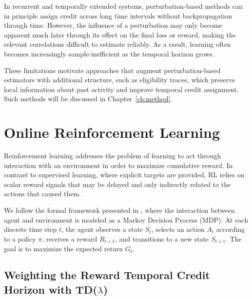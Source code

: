 In recurrent and temporally extended systems, perturbation-based methods
can in principle assign credit across long time intervals without
backpropagation through time. However, the influence of a perturbation may
only become apparent much later through its effect on the final loss or
reward, making the relevant correlations difficult to estimate reliably.
As a result, learning often becomes increasingly sample-inefficient as the
temporal horizon grows.

These limitations motivate approaches that augment perturbation-based
estimators with additional structure, such as eligibility traces, which
preserve local information about past activity and improve temporal credit
assignment. Such methods will be discussed in Chapter~\ref{ch:method}.

\section{Online Reinforcement Learning}
\label{sec:online-rl}
 Reinforcement learning addresses the problem of learning to act through interaction with an environment in order to maximize cumulative reward. In contrast to supervised learning, where explicit targets are provided, RL relies on scalar reward signals that may be delayed and only indirectly related to the actions that caused them.

We follow the formal framework presented in \citet{SuttonBarto2018}, where the interaction between agent and environment is modeled as a Markov Decision Process (MDP). At each discrete time step $t$, the agent observes a state $S_t$, selects an action $A_t$ according to a policy $\pi$, receives a reward $R_{t+1}$, and transitions to a new state $S_{t+1}$. The goal is to maximize the expected return $G_t$.

\subsection{Weighting the Reward Temporal Credit Horizon with TD($\lambda$)}

